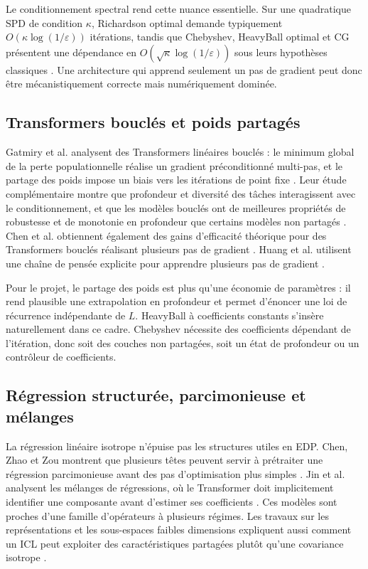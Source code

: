\documentclass[11pt,a4paper]{article}
\begin{document}
Le conditionnement spectral rend cette nuance essentielle. Sur une quadratique
SPD de condition $\kappa$, Richardson optimal demande typiquement
$O(\kappa\log(1/\varepsilon))$ itérations, tandis que Chebyshev, HeavyBall
optimal et CG présentent une dépendance en $O(\sqrt\kappa
\log(1/\varepsilon))$ sous leurs hypothèses classiques
\cite{polyak1964,saad2003}. Une architecture qui apprend seulement un pas de
gradient peut donc être mécanistiquement correcte mais numériquement dominée.

\subsection{Transformers bouclés et poids partagés}

Gatmiry et al. analysent des Transformers linéaires bouclés : le minimum global
de la perte populationnelle réalise un gradient préconditionné multi-pas, et le
partage des poids impose un biais vers les itérations de point fixe
\cite{gatmiry2024learn}. Leur étude complémentaire montre que profondeur et
diversité des tâches interagissent avec le conditionnement, et que les modèles
bouclés ont de meilleures propriétés de robustesse et de monotonie en
profondeur que certains modèles non partagés \cite{gatmiry2024depth}.
Chen et al. obtiennent également des gains d'efficacité théorique pour des
Transformers bouclés réalisant plusieurs pas de gradient
\cite{chen2024looped}. Huang et al. utilisent une chaîne de pensée explicite
pour apprendre plusieurs pas de gradient \cite{huang2025cot}.

Pour le projet, le partage des poids est plus qu'une économie de paramètres :
il rend plausible une extrapolation en profondeur et permet d'énoncer une loi
de récurrence indépendante de $L$. HeavyBall à coefficients constants s'insère
naturellement dans ce cadre. Chebyshev nécessite des coefficients dépendant de
l'itération, donc soit des couches non partagées, soit un état de profondeur ou
un contrôleur de coefficients.

\subsection{Régression structurée, parcimonieuse et mélanges}

La régression linéaire isotrope n'épuise pas les structures utiles en EDP.
Chen, Zhao et Zou montrent que plusieurs têtes peuvent servir à prétraiter une
régression parcimonieuse avant des pas d'optimisation plus simples
\cite{chen2024sparse}. Jin et al. analysent les mélanges de régressions, où le
Transformer doit implicitement identifier une composante avant d'estimer ses
coefficients \cite{jin2024mixture}. Ces modèles sont proches d'une famille
d'opérateurs à plusieurs régimes. Les travaux sur les représentations et les
sous-espaces faibles dimensions expliquent aussi comment un ICL peut exploiter
des caractéristiques partagées plutôt qu'une covariance isotrope
\cite{guo2023representations,kwon2025subspace}.
\end{document}
